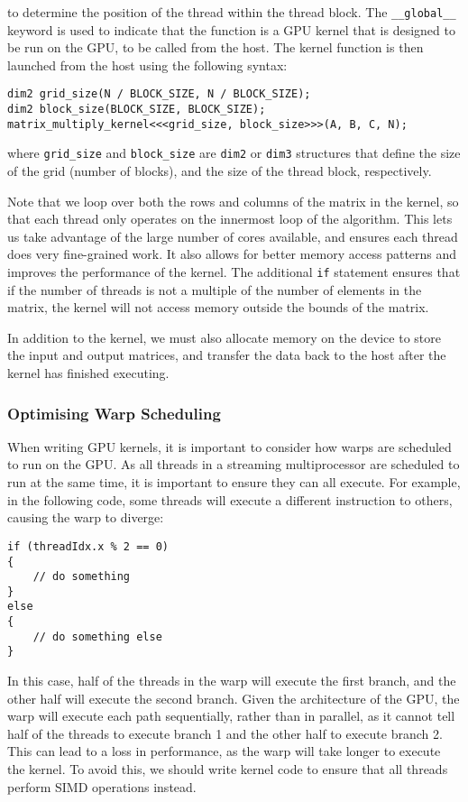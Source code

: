 \documentclass{article}
\begin{document}
to determine the position of the thread within the thread block. The
\texttt{__global__} keyword is used to indicate that the
function is a GPU kernel that is designed to be run on the GPU, to be
called from the host. The kernel function is then launched from the
host using the following syntax:
\begin{verbatim}
dim2 grid_size(N / BLOCK_SIZE, N / BLOCK_SIZE);
dim2 block_size(BLOCK_SIZE, BLOCK_SIZE);
matrix_multiply_kernel<<<grid_size, block_size>>>(A, B, C, N);
\end{verbatim}
where \texttt{grid_size} and \texttt{block_size} are
\texttt{dim2} or \texttt{dim3} structures that define
the size of the grid (number of blocks), and the size of the thread
block, respectively.

Note that we loop over both the rows and columns of the matrix in the
kernel, so that each thread only operates on the innermost loop of the
algorithm. This lets us take advantage of the large number of cores
available, and ensures each thread does very fine-grained work. It also
allows for better memory access patterns and improves the performance
of the kernel. The additional \texttt{if} statement ensures
that if the number of threads is not a multiple of the number of
elements in the matrix, the kernel will not access memory outside the
bounds of the matrix.

In addition to the kernel, we must also allocate memory on the device
to store the input and output matrices, and transfer the data back to
the host after the kernel has finished executing.
\subsubsection{Optimising Warp Scheduling}
When writing GPU kernels, it is important to consider how warps are
scheduled to run on the GPU. As all threads in a streaming
multiprocessor are scheduled to run at the same time, it is important
to ensure they can all execute. For example, in the following code,
some threads will execute a different instruction to others, causing
the warp to diverge:
\begin{verbatim}
if (threadIdx.x % 2 == 0)
{
    // do something
}
else
{
    // do something else
}
\end{verbatim}
In this case, half of the threads in the warp will execute the first
branch, and the other half will execute the second branch. Given the
architecture of the GPU, the warp will execute each path sequentially,
rather than in parallel, as it cannot tell half of the threads to
execute branch 1 and the other half to execute branch 2. This can lead
to a loss in performance, as the warp will take longer to execute the
kernel. To avoid this, we should write kernel code to ensure that all
threads perform SIMD operations instead.
\end{document}
